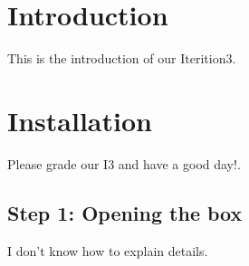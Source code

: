 \hypertarget{index_intro_sec}{}\section{Introduction}\label{index_intro_sec}
This is the introduction of our Iterition3.\hypertarget{index_install_sec}{}\section{Installation}\label{index_install_sec}
Please grade our I3 and have a good day!.\hypertarget{index_step1}{}\subsection{Step 1\-: Opening the box}\label{index_step1}
I don't know how to explain details. 